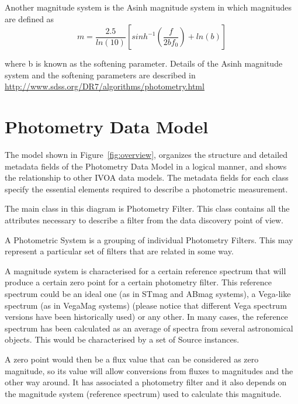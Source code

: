 \documentclass[11pt,a4paper]{ivoa}
\begin{document}
Another magnitude system is the Asinh magnitude system in which magnitudes
are defined as
\begin{equation} \label{eq:13}
m = \frac{2.5}{ln(10)} \left[ sinh^{-1}(\frac{f}{2bf_0}) +ln(b) \right]
\end{equation}


where b is known as the softening parameter. Details of the Asinh magnitude
system and the softening parameters are described in
\url{http://www.sdss.org/DR7/algorithms/photometry.html}
\par

\section{Photometry Data Model} \label{datamodel}
The model shown in Figure~\ref{fig:overview}, organizes the structure and detailed metadata
fields of the Photometry Data Model in a logical manner, and shows the
relationship to other IVOA data models. The metadata fields for each class
specify the essential elements required to describe a photometric measurement.
\par

The main class in this diagram is Photometry Filter. This class contains
all the attributes necessary to describe a filter from the data discovery
point of view.
\par

A Photometric System is a grouping of individual Photometry Filters. This may
represent a particular set of filters that are related in some way.
\par

A magnitude system is characterised for a certain reference spectrum that
will produce a certain zero point for a certain photometry filter. This
reference spectrum could be an ideal one (as in STmag and ABmag systems), a
Vega-like spectrum (as in VegaMag systems) (please notice that different Vega
spectrum versions have been historically used) or any other. In many cases,
the reference spectrum has been calculated as an average of spectra from several
astronomical objects. This would be characterised by a set of Source instances.
\par

A zero point would then be a flux value that can be considered as zero
magnitude, so its value will allow conversions from fluxes to magnitudes
and the other way around. It has associated a photometry filter and it also
depends on the magnitude system (reference spectrum) used to calculate this
magnitude.
\par
\end{document}
